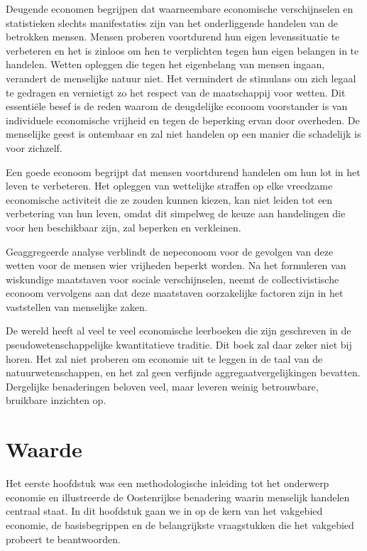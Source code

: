 \documentclass[
  a5paper,
  smalldemyvopaper,11pt,twoside,onecolumn,openright,extrafontsizes,
hidelinks]{memoir}
\begin{document}
Deugende economen begrijpen dat waarneembare economische verschijnselen
en statistieken slechts manifestaties zijn van het onderliggende
handelen van de betrokken mensen. Mensen proberen voortdurend hun eigen
levenssituatie te verbeteren en het is zinloos om hen te verplichten
tegen hun eigen belangen in te handelen. Wetten opleggen die tegen het
eigenbelang van mensen ingaan, verandert de menselijke natuur niet. Het
vermindert de stimulans om zich legaal te gedragen en vernietigt zo het
respect van de maatschappij voor wetten. Dit essentiële besef is de
reden waarom de deugdelijke econoom voorstander is van individuele
economische vrijheid en tegen de beperking ervan door overheden. De
menselijke geest is ontembaar en zal niet handelen op een manier die
schadelijk is voor zichzelf.

Een goede econoom begrijpt dat mensen voortdurend handelen om hun lot in
het leven te verbeteren. Het opleggen van wettelijke straffen op elke
vreedzame economische activiteit die ze zouden kunnen kiezen, kan niet
leiden tot een verbetering van hun leven, omdat dit simpelweg de keuze
aan handelingen die voor hen beschikbaar zijn, zal beperken en
verkleinen.

Geaggregeerde analyse verblindt de nepeconoom voor de gevolgen van deze
wetten voor de mensen wier vrijheden beperkt worden. Na het formuleren
van wiskundige maatstaven voor sociale verschijnselen, neemt de
collectivistische econoom vervolgens aan dat deze maatstaven
oorzakelijke factoren zijn in het vaststellen van menselijke zaken.

De wereld heeft al veel te veel economische leerboeken die zijn
geschreven in de pseudowetenschappelijke kwantitatieve traditie. Dit
boek zal daar zeker niet bij horen. Het zal niet proberen om economie
uit te leggen in de taal van de natuurwetenschappen, en het zal geen
verfijnde aggregaatvergelijkingen bevatten. Dergelijke benaderingen
beloven veel, maar leveren weinig betrouwbare, bruikbare inzichten op.

\chapter{Waarde}\label{sec-waarde}

Het eerste hoofdstuk was een methodologische inleiding tot het onderwerp
economie en illustreerde de Oostenrijkse benadering waarin menselijk
handelen centraal staat. In dit hoofdstuk gaan we in op de kern van het
vakgebied economie, de basisbegrippen en de belangrijkste vraagstukken
die het vakgebied probeert te beantwoorden.
\end{document}
